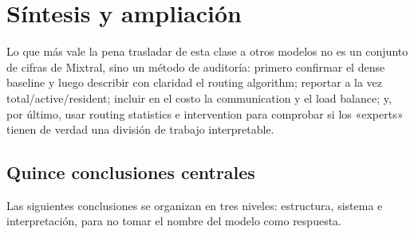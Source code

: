 \section{Síntesis y ampliación}

Lo que más vale la pena trasladar de esta clase a otros modelos no es un conjunto de cifras de Mixtral, sino un método de auditoría: primero confirmar el dense baseline y luego describir con claridad el routing algorithm; reportar a la vez total/active/resident; incluir en el costo la communication y el load balance; y, por último, usar routing statistics e intervention para comprobar si los «experts» tienen de verdad una división de trabajo interpretable.

\subsection{Quince conclusiones centrales}

Las siguientes conclusiones se organizan en tres niveles: estructura, sistema e interpretación, para no tomar el nombre del modelo como respuesta.


